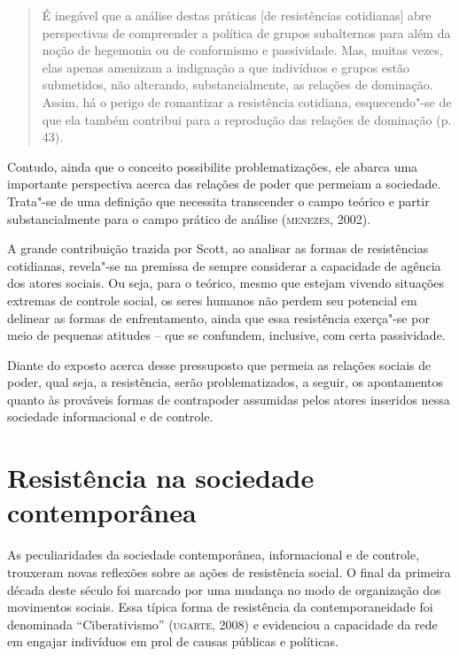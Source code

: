 \begin{quote}
É inegável que a análise destas práticas [de resistências
cotidianas] abre perspectivas de compreender a política de grupos
subalternos para além da noção de hegemonia ou de conformismo e
passividade. Mas, muitas vezes, elas apenas amenizam a indignação a que
indivíduos e grupos estão submetidos, não alterando, substancialmente,
as relações de dominação. Assim, há o perigo de romantizar a resistência
cotidiana, esquecendo"-se de que ela também contribui para a reprodução
das relações de dominação (p. 43).
\end{quote}

Contudo, ainda que o conceito possibilite problematizações, ele abarca
uma importante perspectiva acerca das relações de poder que permeiam a
sociedade. Trata"-se de uma definição que necessita transcender o campo
teórico e partir substancialmente para o campo prático de análise
(\textsc{menezes}, 2002).

A grande contribuição trazida por Scott, ao analisar as formas de
resistências cotidianas, revela"-se na premissa de sempre considerar a
capacidade de agência dos atores sociais. Ou seja, para o teórico, mesmo
que estejam vivendo situações extremas de controle social, os seres
humanos não perdem seu potencial em delinear as formas de enfrentamento,
ainda que essa resistência exerça"-se por meio de pequenas atitudes --
que se confundem, inclusive, com certa passividade.

Diante do exposto acerca desse pressuposto que permeia as relações
sociais de poder, qual seja, a resistência, serão problematizados, a
seguir, os apontamentos quanto às prováveis formas de contrapoder
assumidas pelos atores inseridos nessa sociedade informacional e de
controle.

\section{Resistência na sociedade contemporânea}

\noindent{}As peculiaridades da sociedade contemporânea, informacional e de
controle, trouxeram novas reflexões sobre as ações de resistência
social. O final da primeira década deste século foi marcado por uma
mudança no modo de organização dos movimentos sociais. Essa típica forma
de resistência da contemporaneidade foi denominada ``Ciberativismo''
(\textsc{ugarte}, 2008) e evidenciou a capacidade da rede em engajar indivíduos
em prol de causas públicas e políticas.

